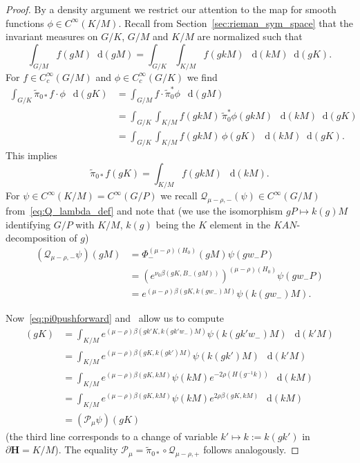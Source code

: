 \documentclass[AHL, Unicode, longabstracts, published]{cedram}
\newcommand{\bfh}{\mathbf{H}}
\newcommand{\pl}{\partial}
\newcommand{\til}{\widetilde}
\newcommand{\intd}{\mathop{}\!\mathrm{d}}
\begin{document}
\begin{proof}
By a density argument we restrict our attention to the map for smooth functions $\phi\in C^\infty(K/M)$. Recall from Section~\ref{sec:rieman_sym_space} that the invariant measures on $G/K$, $G/M$ and $K/M$ are normalized such that
\[
\int_{G/M}f(gM) \intd (gM) = \int_{G/K}\int_{K/M} f(gkM)~\intd (kM)\intd (gK).
\]
For $f\in C^\infty_c(G/M)$ and $\phi\in C^\infty_c(G/K)$ we find
\begin{align*}
\int_{G/K}\til\pi_{0*}f\cdot \phi~\intd (gK) &=\int_{G/M}f\cdot \til\pi_{0}^*\phi~\intd (gM)\\
&=\int_{G/K}\int_{K/M}f(gkM)\, \til\pi_{0}^*\phi(gkM)~\intd (kM) \intd (gK)\\
&=\int_{G/K}\int_{K/M}f(gkM)\, \phi(gK)~\intd (kM) \intd (gK).
\end{align*}
This implies
\begin{equation}\label{eq:pi0pushforward}
\til\pi_{0*}f(gK)=\int_{K/M}f(gkM)~\intd (kM).
\end{equation}
For $\psi\in C^\infty(K/M)=C^\infty(G/P)$ we recall $\mathcal Q_{\mu-\rho,-}(\psi)\in C^\infty(G/M)$ from~\eqref{eq:Q_lambda_def} and note that (we use the isomorphism $gP\mapsto k(g)M$ identifying $G/P$ with $K/M$, $k(g)$ being the $K$ element in the $KAN$-decomposition of $g$)
\begin{align*}
(\mathcal Q_{\mu-\rho,-}\psi)(gM) &=\Phi_-^{(\mu-\rho)(H_0)}(gM)\psi(gw_-P)\\
&=\left(e^{\nu_0\beta(gK,B_-(gM))}\right)^{(\mu-\rho)(H_0)}\psi(gw_-P)\\
&=e^{(\mu-\rho)\beta(gK, k(gw_-)M)}\psi(k(gw_-)M).
\end{align*}

Now~\eqref{eq:pi0pushforward} and~\cite[Lemma~I.5.19]{Hel84} allow us to compute
\begin{align*}
[(\til{\pi}_{0*} \circ \mathcal Q_{\mu-\rho, -}) \psi](gK) &= \int_{K/M} e^{(\mu-\rho)\beta(gk'K, k(gk'w_-)M)} \psi(k(gk'w_-)M)~\intd (k'M)\\
&= \int_{K/M} e^{(\mu-\rho)\beta(gK, k(gk')M)} \psi(k(gk')M)~\intd (k'M)\\
&= \int_{K/M} e^{(\mu-\rho)\beta(gK, kM)} \psi(kM)e^{-2\rho(H(g^{-1}k))}~\intd (kM)\\
&= \int_{K/M} e^{(\mu-\rho)\beta(gK, kM)} \psi(kM)e^{2\rho\beta(gK, kM)}~\intd (kM)\\
&= (\mathcal P_\mu\psi)(gK)
\end{align*}
(the third line corresponds to a change of variable $k'\mapsto k:=k(gk')$ in $\pl {\bfh}=K/M$). The equality $\mathcal P_\mu = \til{\pi}_{0*} \circ \mathcal Q_{\mu-\rho, +}$ follows analogously.
\end{proof}
\end{document}
